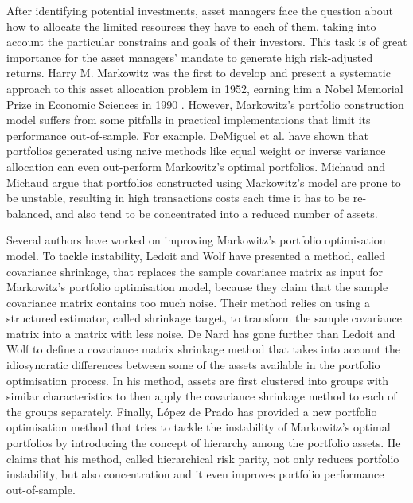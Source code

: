 After identifying potential investments, asset managers face the question about how to allocate the limited resources they have to each of them, taking into account the particular constrains and goals of their investors. This task is of great importance for the asset managers' mandate to generate high risk-adjusted returns. Harry M. Markowitz was the first to develop and present a systematic approach to this asset allocation problem in 1952, earning him a Nobel Memorial Prize in Economic Sciences in 1990 \cite{markowitznobelprize}. However, Markowitz's portfolio construction model suffers from some pitfalls in practical implementations that limit its performance out-of-sample. For example, DeMiguel et al. \cite{equalweight} have shown that portfolios generated using naive methods like equal weight or inverse variance allocation can even out-perform Markowitz's optimal portfolios. Michaud and Michaud \cite{michaudreturnsstability} argue that portfolios constructed using Markowitz's model are prone to be unstable, resulting in high transactions costs each time it has to be re-balanced, and also tend to be concentrated into a reduced number of assets.

Several authors have worked on improving Markowitz's portfolio optimisation model. To tackle instability, Ledoit and Wolf \cite{ledoit} have presented a method, called covariance shrinkage, that replaces the sample covariance matrix as input for Markowitz's portfolio optimisation model, because they claim that the sample covariance matrix contains too much noise. Their method relies on using a structured estimator, called shrinkage target, to transform the sample covariance matrix into a matrix with less noise. De Nard \cite{denard} has gone further than Ledoit and Wolf to define a covariance matrix shrinkage method that takes into account the idiosyncratic differences between some of the assets available in the portfolio optimisation process. In his method, assets are first clustered into groups with similar characteristics to then apply the covariance shrinkage method to each of the groups separately. Finally, López de Prado \cite{lopezmain} has provided a new portfolio optimisation method that tries to tackle the instability of Markowitz's optimal portfolios by introducing the concept of hierarchy among the portfolio assets. He claims that his method, called hierarchical risk parity, not only reduces portfolio instability, but also concentration and it even improves portfolio performance out-of-sample.

